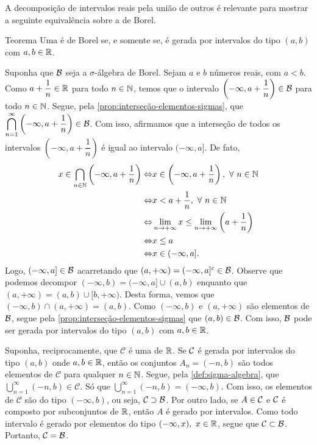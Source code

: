 A decomposição de intervalos reais pela união de outros é relevante para mostrar a seguinte equivalência sobre a \sigal de Borel.\\
\begin{env}{Teorema}
\label{teo:equiv-borel}
    Uma \sigal é de Borel  se, e somente se, é gerada por intervalos do tipo $(a,b)$ com $a,b \in \mathbb{R}$.
    \vspace{-0.2cm}
\end{env}
\begin{prova}
   Suponha que $\operatorname{\mathcal{B}}$ seja a $\sigma$-álgebra de Borel. 
   Sejam $a$ e $b$ números reais, com $a<b$.
   Como $a + \dfrac{1}{n} \in \mathbb{R}$ para todo $n \in \operatorname{\mathbb{N}}$, temos que o intervalo
   $
   \left(-\infty, a + \dfrac{1}{n}\right) \in \operatorname{\mathcal{B}}$ para todo $n \in \operatorname{\mathbb{N}}
   $.
   Segue, pela \ref{prop:interseção-elementos-sigmas}, que
   $
   \displaystyle \bigcap_{n = 1}^\infty \left(-\infty, a+ \dfrac{1}{n}\right) \in \operatorname{\mathcal{B}}
   $.
   Com isso, afirmamos que a interseção de todos os intervalos $\left(-\infty, a + \dfrac{1}{n}\right)$ é igual ao intervalo $(-\infty, a]$.
   De fato,
   \begin{align*}
	x \in \bigcap_{n \in \operatorname{\mathbb{N}}} \left(-\infty, a + \dfrac{1}{n}\right)
   	\Leftrightarrow & x \in \left(-\infty, a + \dfrac{1}{n}\right), \ \forall \ n \in \operatorname{\mathbb{N}}\\
   	\Leftrightarrow & x < a + \dfrac{1}{n}, \ \forall \ n \in \operatorname{\mathbb{N}}\\
   	\Leftrightarrow & \displaystyle \lim_{n \to +\infty} x \leq \displaystyle \lim_{n \to +\infty} \left(a + \dfrac{1}{n}\right)\\
   	\Leftrightarrow & x \leq a\\
   	\Leftrightarrow & x \in (-\infty, a].
   \end{align*}
	Logo, $(-\infty, a] \in \operatorname{\mathcal{B}}$ acarretando que $(a, +\infty) = (-\infty, a]^c \in \operatorname{\mathcal{B}}$.
	Observe que podemos decompor $(-\infty, b) = (-\infty,a] \cup (a, b)$ enquanto que $(a, +\infty) = (a, b) \cup [b, +\infty)$.
	Desta forma, vemos que $(-\infty, b) \cap (a, +\infty) = (a,b)$. 
	Como $(-\infty, b)$ e $(a, +\infty)$ são elementos de $\operatorname{\mathcal{B}}$, segue pela 
	\ref{prop:interseção-elementos-sigmas} que $(a,b) \in \operatorname{\mathcal{B}}$.
	Com isso, $\operatorname{\mathcal{B}}$ pode ser gerada por intervalos do tipo $(a,b)$ com $a,b \in \mathbb{R}$.
   
	Suponha, reciprocamente, que $\mathcal{C}$ é uma \sigal de $\mathbb{R}$.
	Se $\operatorname{\mathcal{C}}$ é gerada por intervalos do tipo $(a,b)$ onde $a,b \in \mathbb{R}$, então
	os conjuntos $A_n = (-n, b)$ são todos elementos de $\mathcal{C}$ para qualquer $n \in \operatorname{\mathbb{N}}$.
	Segue, pela  \ref{def:sigma-algebra}, que 
	$\displaystyle \bigcup_{n = 1}^\infty (-n,b) \in \mathcal{C}$.
	Só que $\displaystyle \bigcup_{n = 1}^\infty (-n,b) = (-\infty, b)$.
	Com isso, os elementos de $\mathcal{C}$ são do tipo $(-\infty, b)$, ou seja, $\mathcal{C} \supset \operatorname{\mathcal{B}}$.
	Por outro lado, se $A \in \operatorname{\mathcal{C}}$ e $\operatorname{\mathcal{C}}$ é composto por subconjuntos de $\mathbb{R}$, então $A$ é gerado por intervalos.
	Como todo intervalo é gerado por elementos do tipo 
	$(-\infty, x),\ x \in \mathbb{R}$, segue que $\mathcal{C} \subset \operatorname{\mathcal{B}}$. 
	Portanto, $\mathcal{C} = \operatorname{\mathcal{B}}$.
\end{prova}

